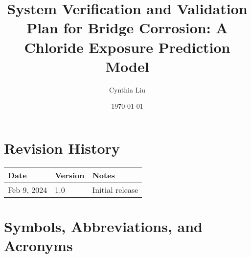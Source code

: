 \documentclass[12pt, titlepage]{article}
\begin{document}
\title{System Verification and Validation Plan for Bridge Corrosion: A Chloride Exposure Prediction Model} 
\author{Cynthia Liu}
\date{\today}
	
\maketitle


\section*{Revision History}

\begin{tabularx}{\textwidth}{p{3cm}p{2cm}X}
\toprule {\bf Date} & {\bf Version} & {\bf Notes}\\
\midrule
Feb 9, 2024 & 1.0 & Initial release\\
\bottomrule
\end{tabularx}



\newpage

\tableofcontents

\listoftables


\newpage

\section{Symbols, Abbreviations, and Acronyms}
\end{document}
